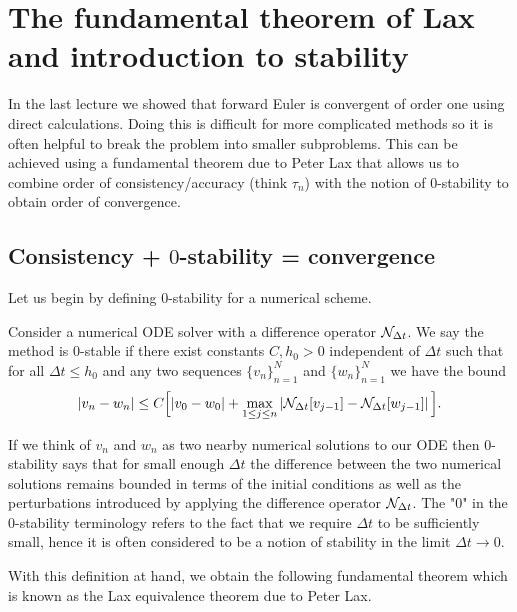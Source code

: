 \chapter{The fundamental theorem of Lax and introduction to stability}
\label{ch:fund-lax-intro-stability}

In the last lecture we showed that forward Euler is convergent of 
order one using direct calculations. Doing this is difficult for more 
complicated methods so it is often helpful to break the problem 
into smaller subproblems. This can be achieved using a 
fundamental theorem due to Peter Lax that allows us 
to combine order of consistency/accuracy (think $\tau_n$) 
with the notion of $0$-stability to obtain order of convergence.  


\section{Consistency + $0$-stability = convergence}
Let us begin by defining $0$-stability for a numerical scheme. 

\begin{definition}[$0$-stability]
    Consider a numerical ODE solver with a difference operator 
    $\mathcal{N}_{\Delta t}$. We say the method is $0$-stable 
    if there exist constants $C, h_0 >0$ 
    independent of $\Delta t$ 
    such that
    for all $\Delta t \le h_0$ and 
     any two sequences $\{v_n\}_{n=1}^N$ and 
    $\{w_n\}_{n=1}^N$  
    we have the bound 
    \begin{equation*}
        |v_n - w_n| \le C \Big[ | v_0 - w_0| 
        + \max_{1 \le j \le n} \left| \mathcal{N}_{\Delta t}[v_{j-1}] - 
        \mathcal{N}_{\Delta t}[w_{j-1}] \right| \Big].
    \end{equation*}
\end{definition}
If we think of $v_n$ and $w_n$ as two
nearby numerical solutions 
to our ODE then $0$-stability says that for small enough $\Delta t$ 
the difference between the two numerical solutions 
remains bounded in terms of the initial conditions as well as 
the perturbations introduced by 
applying the difference operator $\mathcal{N}_{\Delta t}$. The "0" in 
the $0$-stability terminology refers to the fact that we 
require $\Delta t$ to be sufficiently small, hence it is 
often considered to be a notion of stability in the
limit $\Delta t \to 0$.

With this definition at hand, we obtain the following fundamental 
theorem which is known as the Lax equivalence theorem due to 
Peter Lax. 

